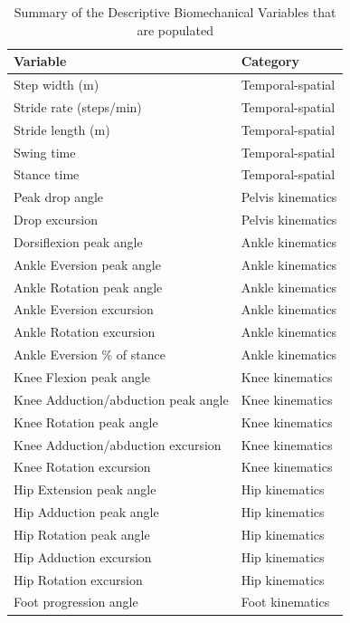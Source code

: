 \begin{table}[ht]
    \centering
    \caption[Populated Descriptive Variables Summary]{Summary of the Descriptive Biomechanical Variables that are populated\label{tab:met-desc-variable-init}}
    \begin{tabular}{lp{}}
    \hline
    \textbf{Variable} & \textbf{Category} \\
    \hline
    Step width (m) & Temporal-spatial \\
    Stride rate (steps/min) & Temporal-spatial \\
    Stride length (m) & Temporal-spatial \\
    Swing time & Temporal-spatial \\
    Stance time & Temporal-spatial \\
    Peak drop angle & Pelvis kinematics \\
    Drop excursion & Pelvis kinematics \\
    Dorsiflexion peak angle & Ankle kinematics \\
    Ankle Eversion peak angle & Ankle kinematics \\
    Ankle Rotation peak angle & Ankle kinematics \\
    Ankle Eversion excursion & Ankle kinematics \\
    Ankle Rotation excursion & Ankle kinematics \\
    Ankle Eversion \% of stance & Ankle kinematics \\
    Knee Flexion peak angle & Knee kinematics \\
    Knee Adduction/abduction peak angle & Knee kinematics \\
    Knee Rotation peak angle & Knee kinematics \\
    Knee Adduction/abduction excursion & Knee kinematics \\
    Knee Rotation excursion & Knee kinematics \\
    Hip Extension peak angle & Hip kinematics \\
    Hip Adduction peak angle & Hip kinematics \\
    Hip Rotation peak angle & Hip kinematics \\
    Hip Adduction excursion & Hip kinematics \\
    Hip Rotation excursion & Hip kinematics \\
    Foot progression angle & Foot kinematics \\

\end{tabular}
\end{table}
